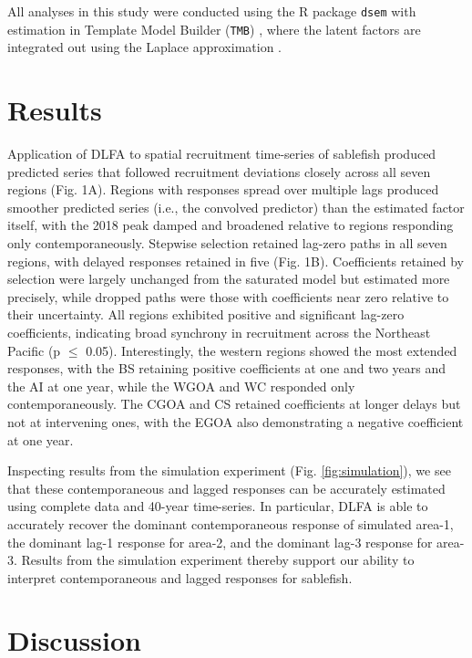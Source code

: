 \documentclass[12pt]{article}
\begin{document}
All analyses in this study were conducted using the R package
\texttt{dsem} \citep{thorson_dynamic_2024} with estimation in Template
Model Builder (\texttt{TMB}) \citep{kristensen_tmb:_2016}, where the
latent factors are integrated out using the Laplace approximation
\citep{skaug_automatic_2006}.

\section{Results}
\label{sec:results}

Application of DLFA to spatial recruitment time-series of sablefish
produced predicted series that followed recruitment deviations closely
across all seven regions (Fig. 1A). Regions with responses spread over
multiple lags produced smoother predicted series (i.e., the convolved
predictor) than the estimated factor itself, with the 2018 peak damped
and broadened relative to regions responding only contemporaneously.
Stepwise selection retained lag-zero paths in all seven regions, with
delayed responses retained in five (Fig. 1B). Coefficients retained by
selection were largely unchanged from the saturated model but estimated
more precisely, while dropped paths were those with coefficients near
zero relative to their uncertainty. All regions exhibited positive and
significant lag-zero coefficients, indicating broad synchrony in
recruitment across the Northeast Pacific (p $\le$ 0.05). Interestingly,
the western regions showed the most extended responses, with the BS
retaining positive coefficients at one and two years and the AI at one
year, while the WGOA and WC responded only contemporaneously. The CGOA
and CS retained coefficients at longer delays but not at intervening
ones, with the EGOA also demonstrating a negative coefficient at one
year.

Inspecting results from the simulation experiment (Fig.
\ref{fig:simulation}), we see that these contemporaneous and lagged
responses can be accurately estimated using complete data and 40-year
time-series. In particular, DLFA is able to accurately recover the
dominant contemporaneous response of simulated area-1, the dominant
lag-1 response for area-2, and the dominant lag-3 response for area-3.
Results from the simulation experiment thereby support our ability to
interpret contemporaneous and lagged responses for sablefish.

\section{Discussion}
\label{sec:discussion}
\end{document}
